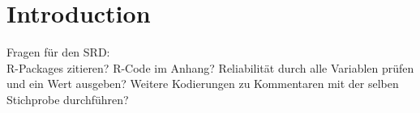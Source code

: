 \section{Introduction}

Fragen für den SRD: \\

R-Packages zitieren? 
R-Code im Anhang? 
Reliabilität durch alle Variablen prüfen und ein Wert ausgeben?
Weitere Kodierungen zu Kommentaren mit der selben Stichprobe durchführen? 



\newpage